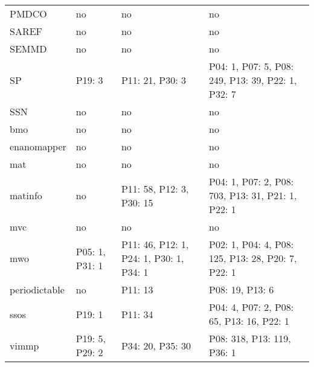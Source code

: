 \begin{tabular}{m{4cm}m{3cm}m{3cm}m{5cm}}
                  PMDCO &                      no &                                       no &                                                no \\
                  SAREF &                      no &                                       no &                                                no \\
                  SEMMD &                      no &                                       no &                                                no \\
                     SP &                  P19: 3 &                          P11: 21, P30: 3 & P04: 1, P07: 5, P08: 249, P13: 39, P22: 1, P32: 7 \\
                    SSN &                      no &                                       no &                                                no \\
                    bmo &                      no &                                       no &                                                no \\
            enanomapper &                      no &                                       no &                                                no \\
                    mat &                      no &                                       no &                                                no \\
                matinfo &                      no &                 P11: 58, P12: 3, P30: 15 & P04: 1, P07: 2, P08: 703, P13: 31, P21: 1, P22: 1 \\
                    mvc &                      no &                                       no &                                                no \\
                    mwo &          P05: 1, P31: 1 &  P11: 46, P12: 1, P24: 1, P30: 1, P34: 1 & P02: 1, P04: 4, P08: 125, P13: 28, P20: 7, P22: 1 \\
          periodictable &                      no &                                  P11: 13 &                                   P08: 19, P13: 6 \\
                   ssos &                  P19: 1 &                                  P11: 34 &          P04: 4, P07: 2, P08: 65, P13: 16, P22: 1 \\
                  vimmp &          P19: 5, P29: 2 &                         P34: 20, P35: 30 &                        P08: 318, P13: 119, P36: 1 \\
\bottomrule
\end{tabular}
